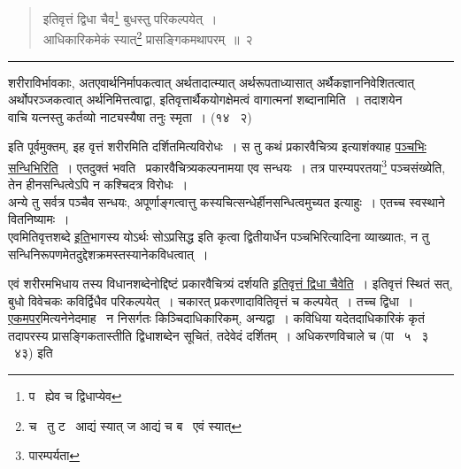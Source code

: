 \documentclass[11pt, openany]{book}
\makeatletter
\newcommand{\devanagarinumeral}[1]{%
	\devanagaridigits{\number \csname c@#1\endcsname}} %
\makeatother
\begin{document}
\newpage
{}
\fancyhead[LE,RO]{\thepage}
\renewcommand{\thepage}{\devanagarinumeral{page}}
\setcounter{page}{2}


\begin{quote}
{\na इतिवृत्तं द्विधा चैव\renewcommand{\thefootnote}{1}\footnote{प \textendash\ ह्येव च द्विधाप्येव} बुधस्तु परिकल्पयेत्~।\\
आधिकारिकमेकं स्यात्\renewcommand{\thefootnote}{2}\footnote{च \textendash\ तु ट \textendash\ आद्यं स्यात् ज आद्यं च ब \textendash\ एवं स्यात्} प्रासङ्गिकमथापरम्~॥~२}
\end{quote}

\hrule

\vspace{2mm}
शरीराविर्भावकाः, अतएवार्थनिर्मापकत्वात् अर्थतादात्म्यात् अर्थरूपताध्यासात् अर्थैकज्ञाननिवेशितत्वात् अर्थोपरञ्जकत्वात् अर्थनिमित्तत्वाद्वा, इतिवृत्तार्थैकयोगक्षेमत्वं वागात्मनां शब्दानामिति~। तदाशयेन \textendash \\

वाचि यत्नस्तु कर्तव्यो नाट्यस्यैषा तनुः स्मृता~। (१४ \textendash\ २)

इति पूर्वमुक्तम्, इह वृत्तं शरीरमिति दर्शितमित्यविरोधः~। स तु कथं प्रकारवैचित्र्य इत्याशंक्याह \underline{पञ्चभिः सन्धिभिरिति}~। एतदुक्तं भवति \textendash\ प्रकारवैचित्र्यकल्पनामया एव सन्धयः~। तत्र पारम्यपरतया\renewcommand{\thefootnote}{3}\footnote{पारम्पर्यता} पञ्चसंख्येति, तेन हीनसन्धित्वेऽपि न कश्चिदत्र विरोधः~।\\

अन्ये तु सर्वत्र पञ्चैव सन्धयः, अपूर्णाङ्गत्वात्तु कस्यचित्सन्धेर्हीनसन्धित्वमुच्यत इत्याहुः~। एतच्च स्वस्थाने वितनिष्यामः~।\\

एवमितिवृत्तशब्दे \underline{इति}भागस्य योऽर्थः सोऽप्रसिद्ध इति कृत्वा द्वितीयार्धेन पञ्चभिरित्यादिना व्याख्यातः, न तु सन्धिनिरूपणमेतदुद्देशक्रमस्तस्यानेकविधत्वात्~।\\

\begin{sloppypar}
एवं शरीरमभिधाय तस्य विधानशब्देनोद्दिष्टं प्रकारवैचित्र्यं दर्शयति \underline{इतिवृत्तं द्विधा चैवेति}~। इतिवृत्तं स्थितं सत्, बुधो विवेचकः कविर्द्विधैव परिकल्पयेत्~। चकारत् प्रकरणादावितिवृत्तं च कल्पयेत्~। तच्च द्विधा~। \underline{एकमपर}मित्यनेनेदमाह \textendash\ न निसर्गतः किञ्चिदाधिकारिकम्, अन्यद्वा~। कविधिया यदेतदाधिकारिकं कृतं तदापरस्य प्रासङ्गिकतास्तीति द्विधाशब्देन सूचितं, तदेवेदं दर्शितम्~। {\qt अधिकरणविचाले च } (पा \textendash\ ५ \textendash\ ३ \textendash\ ४३) इति
\end{sloppypar}
\end{document}
